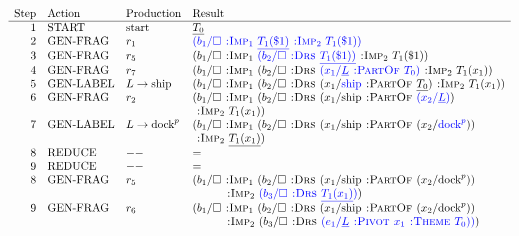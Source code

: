 \documentclass[11pt,a4paper]{article}
\theoremstyle{plain}
\begin{document}
\begin{figure*}
\begin{align*}
\begin{array}{rlll}
\textrm{Step} & \textrm{Action} & \textrm{Production} & \textrm{Result} \\ \hline
  1 & \textrm{START} & \textrm{start} &\underline{T_0} \\
  2 & \textrm{GEN-FRAG} & r_1  &\textcolor{blue}{(b_1/\square \textsc{~:Imp}_1~\underline{T_1(\$1)} \textsc{~:Imp}_2~T_1(\$1))} \\
  3 & \textrm{GEN-FRAG} & r_5  &(b_1/\square \textsc{~:Imp}_1~\textcolor{blue}{(b_2/\square \textsc{~:Drs~} \underline{T_1(\$1))}} \textsc{~:Imp}_2~T_1(\$1)) \\
  4 & \textrm{GEN-FRAG} & r_7  &(b_1/\square \textsc{~:Imp}_1~(b_2/\square \textsc{~:Drs~} \textcolor{blue}{(x_1/\underline{L} \textsc{~:PartOf~} T_0)} \textsc{~:Imp}_2~T_1(x_1)) \\
  5 & \textrm{GEN-LABEL} & L\rightarrow\textrm{ship}  &(b_1/\square \textsc{~:Imp}_1~(b_2/\square \textsc{~:Drs~} (x_1/\textcolor{blue}{\textrm{ship}} \textsc{~:PartOf~} \underline{T_0}) \textsc{~:Imp}_2~T_1(x_1)) \\
  6 & \textrm{GEN-FRAG} & r_2  &(b_1/\square \textsc{~:Imp}_1~(b_2/\square \textsc{~:Drs~} (x_1/\textrm{ship} \textsc{~:PartOf~} \textcolor{blue}{(x_2/\underline{L})}) \\
  & & & \textsc{~:Imp}_2~T_1(x_1)) \\
  7 & \textrm{GEN-LABEL} & L\rightarrow\textrm{dock}^p &(b_1/\square \textsc{~:Imp}_1~(b_2/\square \textsc{~:Drs~} (x_1/\textrm{ship} \textsc{~:PartOf~} (x_2/\textcolor{blue}{\textrm{dock}^p}))\\
  & & & \textsc{~:Imp}_2~\underline{T_1(x_1)}) \\
  8 & \textrm{REDUCE} & -- & =\\
  9 & \textrm{REDUCE} & -- & =\\
  8 & \textrm{GEN-FRAG} & r_5 &(b_1/\square \textsc{~:Imp}_1~(b_2/\square \textsc{~:Drs~} (x_1/\textrm{ship} \textsc{~:PartOf~} (x_2/\textrm{dock}^p))\\  
    & &  &\qquad~~\textsc{~:Imp}_2~\textcolor{blue}{(b_3/\square \textsc{~:Drs~} \underline{T_1(x_1)})}) \\
  9 & \textrm{GEN-FRAG} & r_6 &(b_1/\square \textsc{~:Imp}_1~(b_2/\square \textsc{~:Drs~} (x_1/\textrm{ship} \textsc{~:PartOf~} (x_2/\textrm{dock}^p))\\  
    & &  &\qquad~~\textsc{~:Imp}_2~(b_3/\square \textsc{~:Drs~} \textcolor{blue}{(e_1/\underline{L} \textsc{~:Pivot~} x_1 \textsc{~:Theme~} T_0))}) \\

\end{array}
\end{align*}
\end{figure*}
\end{document}

